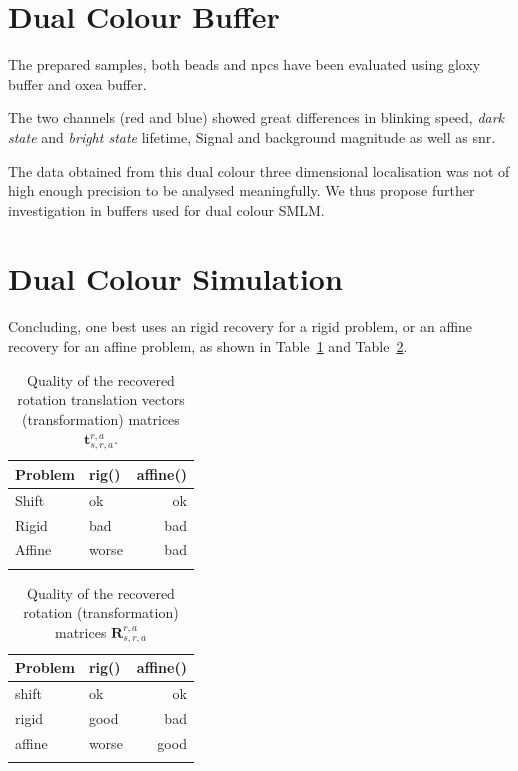 \documentclass[11pt, a4paper, oneside, twocolumn]{report}
\renewcommand{\b}{\textbf}
\newcommand{\e}{\emph}
\begin{document}
\section{Dual Colour Buffer}

The prepared samples, both beads and \gls{npc}s have been evaluated
using \gls{gloxy} buffer and \gls{oxea} buffer.

The two channels (red and blue) showed great differences in blinking
speed, \e{dark state} and \e{bright state} lifetime, Signal and
background magnitude as well as \gls{snr}.

The data obtained from this dual colour three dimensional localisation
was not of high enough precision to be analysed meaningfully. We thus
propose further investigation in buffers used for dual colour SMLM.
  

\section{Dual Colour Simulation}

Concluding, one best uses an rigid recovery for a rigid problem, or an
affine recovery for an affine problem, as shown in Table~\ref{t:t} and
Table~\ref{t:r}.

\begin{table}[!htb]
  \caption{Quality of the recovered rotation translation vectors
    (transformation) matrices $\b{t}_{s,r,a}^{r,a}$.}\label{t:t}
  \begin{tabularx}{.5\textwidth}{X l r}
    \hhline{===}
    Problem & rig() & affine() \\
    \hline
    Shift & ok & ok \\
    Rigid & bad & bad \\
    Affine & worse & bad \\
    \hhline{===}
  \end{tabularx}
\end{table}

\begin{table}[!htb]
  \caption{Quality of the recovered rotation (transformation) matrices
    $\b{R}_{s,r,a}^{r,a}$}\label{t:r}
  \begin{tabularx}{.5\textwidth}{X l r}
    \hhline{===}
    Problem & rig() & affine() \\
    \hline
    shift & ok & ok \\
    rigid & good & bad \\
    affine & worse & good \\
    \hhline{===}
  \end{tabularx}
\end{table}
\end{document}
